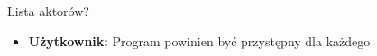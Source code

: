 Lista aktorów? 
\begin{itemize}
    \item \textbf{Użytkownik:} Program powinien być przystępny dla każdego
\end{itemize}